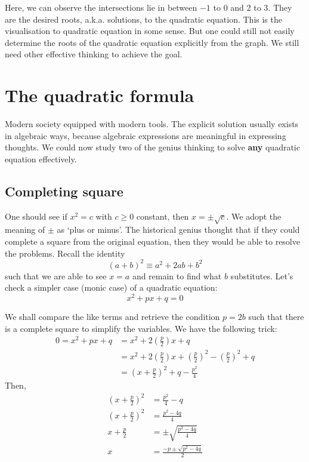 \documentclass[12pt]{article}
\begin{document}
    Here, we can observe the intersections lie in between $-1$ to $0$ and $2$ to $3$. They are the desired roots, a.k.a. solutions, to the quadratic equation. This is the visualisation to quadratic equation in some sense. But one could still not easily determine the roots of the quadratic equation explicitly from the graph. We still need other effective thinking to achieve the goal.

    \section*{The quadratic formula}
    Modern society equipped with modern tools. The explicit solution usually exists in algebraic ways, because algebraic expressions are meaningful in expressing thoughts. We could now study two of the genius thinking to solve \textbf{any} quadratic equation effectively.

    \subsection*{Completing square}
    One should see if $x^2=c$ with $c\geq0$ constant, then $x=\pm\sqrt{c}$. We adopt the meaning of $\pm$ as `plus or minus'. The historical genius thought that if they could complete a square from the original equation, then they would be able to resolve the problems. Recall the identity $$(a+b)^2\equiv a^2+2ab+b^2$$ such that we are able to see $x=a$ and remain to find what $b$ substitutes. Let's check a simpler case (monic case) of a quadratic equation: $$x^2+px+q=0$$

    We shall compare the like terms and retrieve the condition $p=2b$ such that there is a complete square to simplify the variables. We have the following trick:
    \begin{align*}
        0=x^2+px+q&=x^2+2(\frac{p}{2})x+q\\
        &=x^2+2(\frac{p}{2})x+(\frac{p}{2})^2-(\frac{p}{2})^2+q\\
        &=(x+\frac{p}{2})^2+q-\frac{p^2}{4}
    \end{align*}
    Then,
    \begin{align*}
        (x+\frac{p}{2})^2&=\frac{p^2}{4}-q\\
        (x+\frac{p}{2})^2&=\frac{p^2-4q}{4}\\
        x+\frac{p}{2}&=\pm\sqrt{\frac{p^2-4q}{4}}\\
        x&=\frac{-p\pm\sqrt{p^2-4q}}{2}
    \end{align*}
\end{document}
